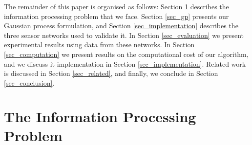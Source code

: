 \documentclass{acmtrans2m}
\begin{document}
The remainder of this paper is organised as follows: Section \ref{sec_info} describes the information processing problem that we face. Section \ref{sec_gp} presents our Gaussian process formulation, and Section \ref{sec_implementation} describes the three sensor networks used to validate it. In Section \ref{sec_evaluation} we present experimental results using data from these networks. In Section \ref{sec_computation} we present results on the computational cost of our algorithm, and we discuss it implementation in Section \ref{sec_implementation}. Related work is discussed in Section \ref{sec_related}, and finally, we conclude in Section \ref{sec_conclusion}.

\section{The Information Processing Problem}\label{sec_info}
\end{document}
